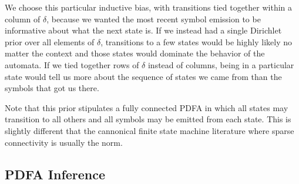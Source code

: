 %
We choose this particular inductive bias, with transitions tied together within a column of $\delta$, because we wanted the most recent symbol emission to be informative about what the next state is.  If we instead had a single Dirichlet prior over all elements of $\delta$, transitions to a few states would be highly likely no matter the context and those states would dominate the behavior of the automata.  If we tied together rows of $\delta$ instead of columns, being in a particular state would tell us more about the sequence of states we came from than the symbols that got us there.  

 Note that this prior stipulates a fully connected PDFA in which all states may transition to all others and all symbols may be emitted from each state.  This is slightly different that the cannonical finite state machine literature where sparse connectivity is usually the norm.

\subsection{PDFA Inference}

